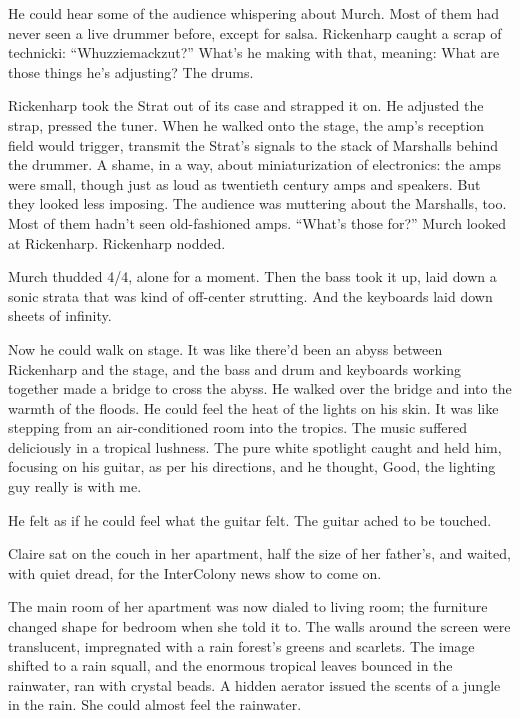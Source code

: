 He could hear some of the audience whispering about Murch. Most of them had never seen a live drummer before, except for salsa. Rickenharp caught a scrap of technicki: “Whuzziemackzut?” What’s he making with that, meaning: What are those things he’s adjusting? The drums.

Rickenharp took the Strat out of its case and strapped it on. He adjusted the strap, pressed the tuner. When he walked onto the stage, the amp’s reception field would trigger, transmit the Strat’s signals to the stack of Marshalls behind the drummer. A shame, in a way, about miniaturization of electronics: the amps were small, though just as loud as twentieth century amps and speakers. But they looked less imposing. The audience was muttering about the Marshalls, too. Most of them hadn’t seen old-fashioned amps. “What’s those for?” Murch looked at Rickenharp. Rickenharp nodded.

Murch thudded 4/4, alone for a moment. Then the bass took it up, laid down a sonic strata that was kind of off-center strutting. And the keyboards laid down sheets of infinity.

Now he could walk on stage. It was like there’d been an abyss between Rickenharp and the stage, and the bass and drum and keyboards working together made a bridge to cross the abyss. He walked over the bridge and into the warmth of the floods. He could feel the heat of the lights on his skin. It was like stepping from an air-conditioned room into the tropics. The music suffered deliciously in a tropical lushness. The pure white spotlight caught and held him, focusing on his guitar, as per his directions, and he thought, Good, the lighting guy really is with me.

He felt as if he could feel what the guitar felt. The guitar ached to be touched.

Claire sat on the couch in her apartment, half the size of her father’s, and waited, with quiet dread, for the InterColony news show to come on.

The main room of her apartment was now dialed to living room; the furniture changed shape for bedroom when she told it to. The walls around the screen were translucent, impregnated with a rain forest’s greens and scarlets. The image shifted to a rain squall, and the enormous tropical leaves bounced in the rainwater, ran with crystal beads. A hidden aerator issued the scents of a jungle in the rain. She could almost feel the rainwater.

